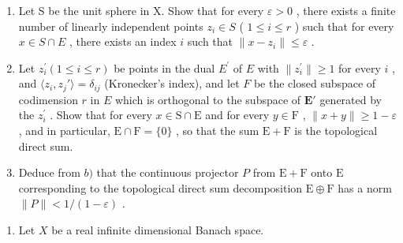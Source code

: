 \begin{enumerate}
\def\labelenumi{\alph{enumi})}
\item
  Let S be the unit sphere in X. Show that for every \(\varepsilon > 0\) , there exists a finite number of linearly independent points \(z_{i} \in S\) ( \(1 \leqslant i \leqslant r\) ) such that for every \(x \in S \cap E\) , there exists an index \(i\) such that \(\| x - z_{i} \| \leqslant \varepsilon\) .
\item
  Let \(z_{i}^{\prime}(1 \leqslant i \leqslant r)\) be points in the dual \(E^{\prime}\) of \(E\) with \(\| z_{i}^{\prime}\| \geqslant 1\) for every \(i\) , and \(\langle z_i, z_j' \rangle = \delta_{ij}\) (Kronecker's index), and let \(F\) be the closed subspace of codimension \(r\) in \(E\) which is orthogonal to the subspace of \(\mathbf{E}'\) generated by the \(z_{i}^{\prime}\) . Show that for every \(x\in \mathrm{S}\cap \mathrm{E}\) and for every \(y\in \mathrm{F}\) , \(\| x + y\| \geqslant 1 - \varepsilon\) , and in particular, \(\mathrm{E}\cap \mathrm{F} = \{0\}\) , so that the sum \(\mathrm{E} + \mathrm{F}\) is the topological direct sum.
\item
  Deduce from \(b)\) that the continuous projector \(P\) from \(\mathrm{E} + \mathrm{F}\) onto \(\mathrm{E}\) corresponding to the topological direct sum decomposition \(\mathrm{E} \oplus \mathrm{F}\) has a norm \(\| P \| < 1 / (1 - \varepsilon)\) .
\end{enumerate}

\begin{enumerate}
\def\labelenumi{\arabic{enumi})}
\setcounter{enumi}{22}
\tightlist
\item
  Let \(X\) be a real infinite dimensional Banach space.
\end{enumerate}

